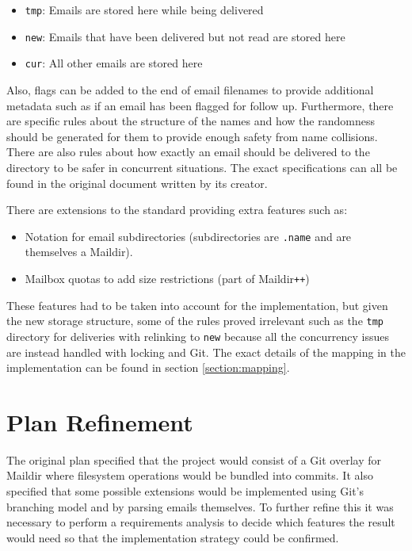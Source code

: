 \begin{itemize}
\item \texttt{tmp}: Emails are stored here while being delivered
\item \texttt{new}: Emails that have been delivered but not read are stored here
\item \texttt{cur}: All other emails are stored here
\end{itemize}

Also, flags can be added to the end of email filenames to provide additional metadata such as if an email has been flagged for follow up. Furthermore, there are specific rules about the structure of the names and how the randomness should be generated for them to provide enough safety from name collisions. There are also rules about how exactly an email should be delivered to the directory to be safer in concurrent situations. The exact specifications can all be found in the original document written by its creator\cite{bernstein2000maildir}.

There are extensions to the standard providing extra features such as:

\begin{itemize}
\item Notation for email subdirectories (subdirectories are \texttt{.name} and are themselves a Maildir).
\item Mailbox quotas to add size restrictions (part of Maildir\texttt{++})
\end{itemize}

These features had to be taken into account for the implementation, but given the new storage structure, some of the rules proved irrelevant such as the \texttt{tmp} directory for deliveries with relinking to \texttt{new} because all the concurrency issues are instead handled with locking and Git. The exact details of the mapping in the implementation can be found in section \ref{section:mapping}.

\section{Plan Refinement}

The original plan specified that the project would consist of a Git overlay for Maildir where filesystem operations would be bundled into commits. It also specified that some possible extensions would be implemented using Git's branching model and by parsing emails themselves. To further refine this it was necessary to perform a requirements analysis to decide which features the result would need so that the implementation strategy could be confirmed.

